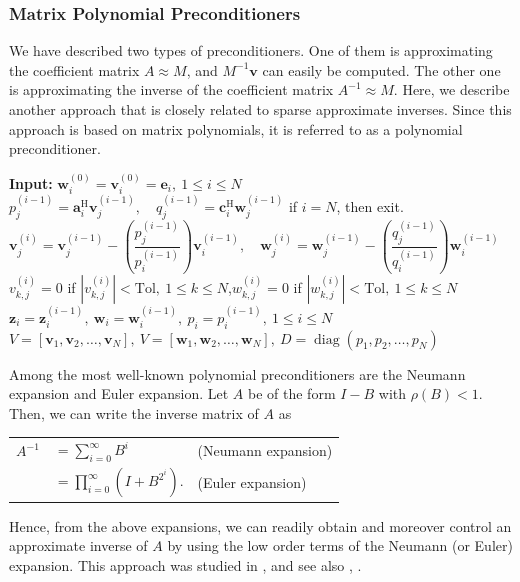 \subsubsection{{Matrix Polynomial Preconditioners}}\label{subsec:polynomial-preconditioners}
{We have described two types of preconditioners. One of them is approximating the coefficient matrix $A\approx M$, and $M^{-1}\bm v$ can easily be computed. The other one is approximating the inverse of the coefficient matrix $A^{-1}\approx M$. Here, we describe another approach that is closely related to sparse approximate inverses. Since this approach is based on matrix polynomials, it is referred to as a polynomial preconditioner.}
\begin{algorithm}[H]\caption{{The AINV preconditioner}}\label{alg:ainv}\begin{algorithmic}[1]
\Statex\textbf{Input:} $\bm w_i^{(0)}=\bm v_i^{(0)}=\bm e_i,\ 1\le i\le N$
\State $p_j^{(i-1)}=\bm a_i^{\mathrm H}\bm v_j^{(i-1)},\quad q_j^{(i-1)}=\bm c_i^{\mathrm H}\bm w_j^{(i-1)}$
\EndFor
\State if $i=N$, then {exit}.
\State $\bm v_j^{(i)}=\bm v_j^{(i-1)}-\left(\dfrac{p_j^{(i-1)}}{p_i^{(i-1)}}\right)\bm v_i^{(i-1)},\quad\bm w_j^{(i)}=\bm w_j^{(i-1)}-\left(\dfrac{q_j^{(i-1)}}{q_i^{(i-1)}}\right)\bm w_i^{(i-1)}$
\State $v_{k,j}^{(i)}=0$ if $|v_{k,j}^{(i)}|<\mathrm{Tol},\ 1\le k\le N$,\quad $w_{k,j}^{(i)}=0$ if $|w_{k,j}^{(i)}|<\mathrm{Tol},\ 1\le k\le N$
\EndFor\EndFor
\State $\bm z_i=\bm z_i^{(i-1)},\ \bm w_i=\bm w_i^{(i-1)},\ p_i=p_i^{(i-1)},\ 1\le i\le N$
\State $V=[\bm v_1,\bm v_2,\ldots,\bm v_N],\ V=[\bm w_1,\bm w_2,\ldots,\bm w_N],\ D=\operatorname{diag}(p_1,p_2,\ldots,p_N)$
\end{algorithmic}\end{algorithm}
{Among the most well-known polynomial preconditioners are the Neumann expansion and Euler expansion. Let $A$ be of the form $I-B$ with $\rho(B)<1$. Then, we can write the inverse matrix of $A$ as}
\begin{center}\begin{tabular}{r@{}ll}
$A^{-1}$&$=\displaystyle\sum_{i=0}^{\infty}B^i$&{(Neumann expansion)}\\[8pt]
&$=\displaystyle\prod_{i=0}^{\infty}(I+B^{2^i}).$&{(Euler expansion)}
\end{tabular}\end{center}
{Hence, from the above expansions, we can readily obtain and moreover control an approximate inverse of $A$ by using the low order terms of the Neumann (or Euler) expansion. This approach was studied in , and see also , .}
